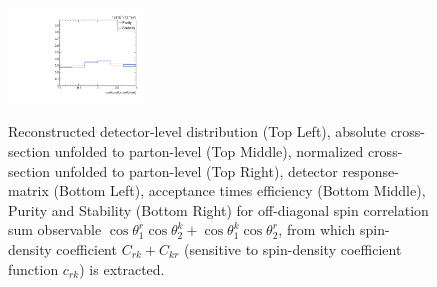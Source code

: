 \begin{figure}[htb]
\begin{center}
 \includegraphics[width=0.32\textwidth]{fig_fullRun2UL/unfolding/combined/PurStab_c_Prk.pdf} \\
\caption{Reconstructed detector-level distribution (Top Left), absolute cross-section unfolded to parton-level (Top Middle), normalized cross-section unfolded to parton-level (Top Right), detector response-matrix (Bottom Left), acceptance times efficiency (Bottom Middle), Purity and Stability (Bottom Right) for off-diagonal spin correlation sum observable $\cos\theta_{1}^{r}\cos\theta_{2}^{k}+\cos\theta_{1}^{k}\cos\theta_{2}^{r}$, from which spin-density coefficient $C_{rk}+C_{kr}$ (sensitive to spin-density coefficient function $c_{r k}$) is extracted.}
\label{fig:c_Prk}
\end{center}
\end{figure}
\clearpage
